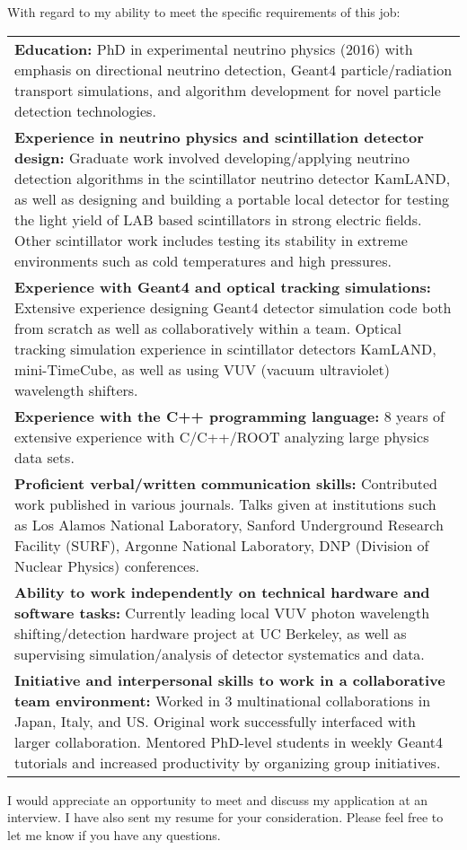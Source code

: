 \documentclass[11pt]{moderncv}        %
\begin{document}
With regard to my ability to meet the specific requirements of this job:\\
\noindent\begin{tabularx}{\linewidth}{@{{}\textbullet\enskip}X@{\quad}@{}}
	\textbf{Education:} PhD in experimental neutrino physics (2016) with
	emphasis on directional neutrino detection, Geant4 particle/radiation
	transport simulations, and algorithm development for novel particle
	detection technologies.\\
	\textbf{Experience in neutrino physics and scintillation detector design:}
	Graduate work involved developing/applying neutrino detection algorithms in
	the scintillator neutrino detector KamLAND, as well as designing and
	building a portable local detector for testing the light yield of LAB based
	scintillators in strong electric fields. Other scintillator work includes
	testing its stability in extreme environments such as cold temperatures and
	high pressures.\\
	\textbf{Experience with Geant4 and optical tracking simulations:} Extensive
	experience designing Geant4 detector simulation code both from scratch as
	well as collaboratively within a team. Optical tracking simulation
	experience in scintillator detectors KamLAND, mini-TimeCube, as well as
	using VUV (vacuum ultraviolet) wavelength shifters.\\
	\textbf{Experience with the C++ programming language:} 8 years of extensive
	experience with C/C++/ROOT analyzing large physics data sets.\\
	\textbf{Proficient verbal/written communication skills:} Contributed work
	published in various journals. Talks given at institutions such as Los
	Alamos National Laboratory, Sanford Underground Research Facility (SURF),
	Argonne National Laboratory, DNP (Division of Nuclear Physics)
	conferences.\\
	\textbf{Ability to work independently on technical hardware and software
	tasks:} Currently leading local VUV photon wavelength shifting/detection
	hardware project at UC Berkeley, as well as supervising simulation/analysis
	of detector systematics and data.\\
	\textbf{Initiative and interpersonal skills to work in a collaborative team
	environment:} Worked in 3 multinational collaborations in Japan, Italy, and
	US. Original work successfully interfaced with larger collaboration.
	Mentored PhD-level students in weekly Geant4 tutorials and increased
	productivity by organizing group initiatives.\\
\end{tabularx}

I would appreciate an opportunity to meet and discuss my application at an
interview. I have also sent my resume for your consideration. Please feel free
to let me know if you have any questions.

\makeletterclosing
\end{document}
